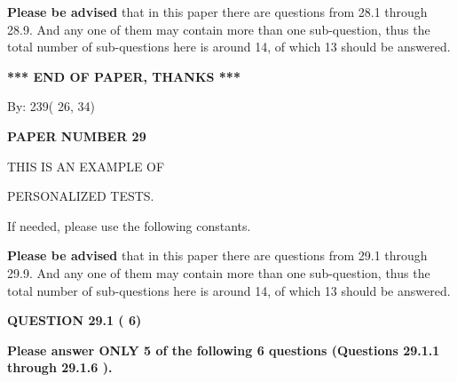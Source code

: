 \documentclass[12pt]{article}
\begin{document}
{\textbf{\large{Please be advised}}} that in this paper there are questions from
28.1 through
28.9.
And any one of them may contain more than one sub-question, thus the total number
of sub-questions here is around 14, of which
13 should be answered.
 
   
   
   
   
\vspace{1.0in} 
{\textbf{\large{ *** END OF PAPER, THANKS *** }}} 
   
   
\hspace{1.0in} By: 
         239(         26,          34)
   
   
   
   
\newpage 
\setcounter{page}{ 
    29001 } 
   
   
   
   
 {\textbf{ \Large{ PAPER NUMBER          29 }}}
   
   
\vspace{0.2in}
   
   
   
   
   
   
 \vspace{0.2in}
 
 
{\Huge  THIS IS AN EXAMPLE OF}
 
{\Huge  PERSONALIZED TESTS. }
 
If needed, please use the following constants.
 
 
 
{\textbf{\large{Please be advised}}} that in this paper there are questions from
29.1 through
29.9.
And any one of them may contain more than one sub-question, thus the total number
of sub-questions here is around 14, of which
13 should be answered.
 
\vspace{0.3in}
 
 
   
   
  
\vspace{0.2in}
  
{\textbf{\Large{QUESTION
29.1 
 (          6)
}}}
  
  
{\textbf{\Large{Please answer ONLY  %
           5 %
 of the following  %
           6 %
 questions (Questions  %
29.1.1 %
 through  %
29.1.6 %
 ). }}}
   
   
  
\end{document}
